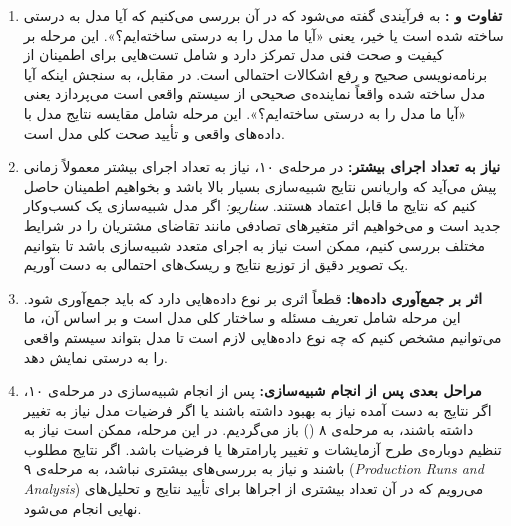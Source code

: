 \begin{enumerate}[label=\textbf{\arabic*}]
	\item \textbf{تفاوت  و :} 
	 به فرآیندی گفته می‌شود که در آن بررسی می‌کنیم که آیا مدل به درستی ساخته شده است یا خیر، یعنی «آیا ما مدل را به درستی ساخته‌ایم؟». این مرحله بر کیفیت و صحت فنی مدل تمرکز دارد و شامل تست‌هایی برای اطمینان از برنامه‌نویسی صحیح و رفع اشکالات احتمالی است. در مقابل،  به سنجش اینکه آیا مدل ساخته شده واقعاً نماینده‌ی صحیحی از سیستم واقعی است می‌پردازد یعنی «آیا ما مدل را به درستی ساخته‌ایم؟». این مرحله شامل مقایسه نتایج مدل با داده‌های واقعی و تأیید صحت کلی مدل است.
	
	\item \textbf{نیاز به تعداد اجرای بیشتر:} 
	در مرحله‌ی ۱۰، نیاز به تعداد اجرای بیشتر معمولاً زمانی پیش می‌آید که واریانس نتایج شبیه‌سازی بسیار بالا باشد و بخواهیم اطمینان حاصل کنیم که نتایج ما قابل اعتماد هستند. 
	\newline
	\textit{سناریو:} اگر مدل شبیه‌سازی یک کسب‌وکار جدید است و می‌خواهیم اثر متغیرهای تصادفی مانند تقاضای مشتریان را در شرایط مختلف بررسی کنیم، ممکن است نیاز به اجرای متعدد شبیه‌سازی باشد تا بتوانیم یک تصویر دقیق از توزیع نتایج و ریسک‌های احتمالی به دست آوریم.
	
	\item \textbf{اثر  بر جمع‌آوری داده‌ها:} 
	قطعاً  اثری بر نوع داده‌هایی دارد که باید جمع‌آوری شود. این مرحله شامل تعریف مسئله و ساختار کلی مدل است و بر اساس آن، ما می‌توانیم مشخص کنیم که چه نوع داده‌هایی لازم است تا مدل بتواند سیستم واقعی را به درستی نمایش دهد.
	
	\item \textbf{مراحل بعدی پس از انجام شبیه‌سازی:} 
	پس از انجام شبیه‌سازی در مرحله‌ی ۱۰، اگر نتایج به دست آمده نیاز به بهبود داشته باشند یا اگر فرضیات مدل نیاز به تغییر داشته باشند، به مرحله‌ی ۸ () باز می‌گردیم. در این مرحله، ممکن است نیاز به تنظیم دوباره‌ی طرح آزمایشات و تغییر پارامترها یا فرضیات باشد. اگر نتایج مطلوب باشند و نیاز به بررسی‌های بیشتری نباشد، به مرحله‌ی ۹ (\textit{Production Runs and Analysis}) می‌رویم که در آن تعداد بیشتری از اجراها برای تأیید نتایج و تحلیل‌های نهایی انجام می‌شود.
\end{enumerate}